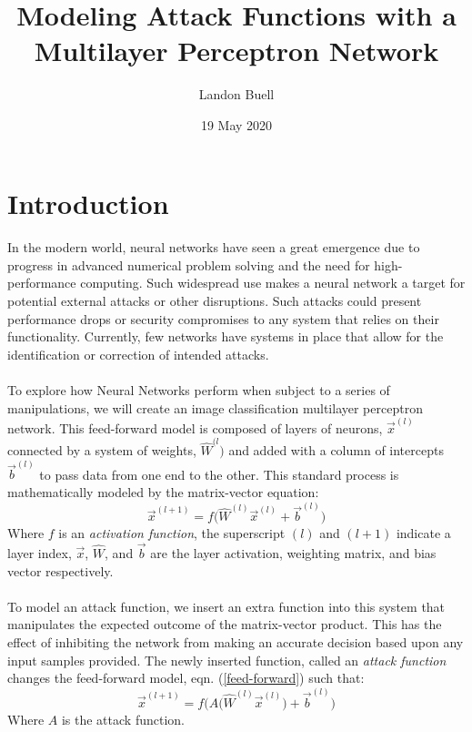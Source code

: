 \documentclass[12pt,letterpaper]{article}
\begin{document}

\title{Modeling Attack Functions with a Multilayer Perceptron Network}
\author{Landon Buell}
\date{19 May 2020}
\maketitle


\section*{Introduction}
\paragraph*{}In the modern world, neural networks have seen a great emergence due to progress in advanced numerical problem solving and the need for high- performance computing. Such widespread use makes a neural network a target for potential external attacks or other disruptions. Such attacks could present performance drops or security compromises to any system that relies on their functionality. Currently, few networks have systems in place that allow for the identification or correction of intended attacks.
\paragraph*{}To explore how Neural Networks perform when subject to a series of manipulations, we will create an image classification multilayer perceptron network. This feed-forward model is composed of layers of neurons, $\vec{x}^{(l)}$ connected by a system of weights, $\hat{W}^{(l})$ and added with a column of intercepts $\vec{b}^{(l)}$ to pass data from one end to the other. This standard process is mathematically modeled by the matrix-vector equation:
\begin{equation}
\label{feed-forward}
\vec{x}^{(l+1)} = f \Big( \hat{W}^{(l)} \vec{x}^{(l)} + \vec{b}^{(l)} \Big)
\end{equation}
Where $f$ is an \textit{activation function}, the superscript $(l)$ and $(l+1)$ indicate a layer index, $\vec{x}$, $\hat{W}$, and $\vec{b}$  are the layer activation, weighting matrix, and bias vector respectively.
\paragraph*{}To model an attack function, we insert an extra function into this system that manipulates the expected outcome of the matrix-vector product. This has the effect of inhibiting the network from making an accurate decision based upon any input samples provided. The newly inserted function, called an \textit{attack function} changes the feed-forward model, eqn. (\ref{feed-forward}) such that:
\begin{equation}
\label{attack}
\vec{x}^{(l+1)} = f \Big( A \big( \hat{W}^{(l)} \vec{x}^{(l)} \big) + \vec{b}^{(l)} \Big)
\end{equation}
Where $A$ is the attack function.
\end{document}

